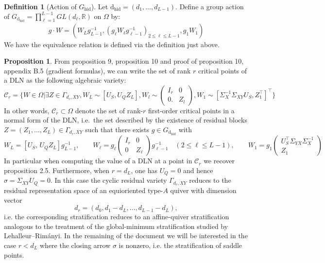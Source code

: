 \documentclass{article}
\newcommand{\hid}{\operatorname{hid}}
\newcommand{\dhid}{\operatorname{d_{hid}}}
\newcommand{\R}{\mathbb{R}}
\theoremstyle{definition}
\newtheorem{proposition}[theorem]{Proposition}
\newtheorem{definition}[theorem]{Definition}
\begin{document}
\begin{definition}[Action of $G_{\hid}$] Let $\dhid = (d_1, \dots, d_{L-1})$. Define a group action of $G_{\dhid} = \prod_{\ell=1}^{L-1} GL(d_\ell,\R)$ on $\Omega$ by:
\begin{align*}
    g\cdot W = (W_Lg_{L-1}^{-1}, (g_\ell W_\ell g_{\ell-1}^{-1})_{2\leq \ell \leq L-1}, g_1W_1)
\end{align*}
We have the equivalence relation is defined via the definition just above.
\end{definition}
\begin{proposition}
From \cite{achour2024loss} proposition 9, proposition 10 and proof of proposition 10, appendix B.5 (gradient formulas), we can write the set of rank $r$ critical points of a DLN as the following algebraic variety:
\begin{equation*}
    \mathcal{C}_r = \{W\in \Omega| \exists Z\in\Gamma_{d_r,XY}, W_L \sim [U_S, U_QZ_L],  W_l \sim \begin{pmatrix} I_r & 0 \\
                                                      0.  & Z_l      
                                        \end{pmatrix}, W_1 \sim [\Sigma_X^{-1}\Sigma_{XY}U_S, Z_1^{\top}]^{\top}\}
\end{equation*} 
In other words, $\mathcal{C}_r \subset \Omega$ denote the set of rank-$r$ first-order critical points in a normal form of the DLN, i.e.\ the set described by the existence of residual blocks $Z = (Z_1, \dots, Z_L)\in \Gamma_{d_r,XY}$ such that there exists $g \in G_{\dhid}$ with
\[
W_L = [U_S,\, U_Q Z_L]g_{L-1}^{-1}, \qquad
W_\ell = g_\ell\begin{pmatrix} I_r & 0 \\ 0 & Z_\ell \end{pmatrix}g_{\ell-1}^{-1} \quad (2\leq \ell \leq L-1), \qquad 
W_1 = g_1\begin{pmatrix} U_S^\top \Sigma_{YX}\Sigma_X^{-1} \\ Z_1 \end{pmatrix}
\]
In particular when computing the value of a DLN at a point in $\mathcal{C}_r$ we recover proposition 2.5. Furthermore, when $r=d_L$, one has $U_Q=0$ and hence $\sigma=\Sigma_{XY}U_Q=0$.
In this case the cyclic residual variety $\Gamma_{d_r,XY}$ reduces to the residual
representation space of an equioriented type-$A$ quiver with dimension vector
\[
d_r = (d_0,d_1-d_L,\dots,d_{L-1}-d_L),
\]
i.e. the corresponding stratification reduces to an affine-quiver stratification analogous to the treatment of the global-minimum
stratification studied by Lehalleur--Rim\'anyi. In the remaining of the document we will be interested in the case $r<d_L$ where the closing arrow $\sigma$ is nonzero, i.e. the stratification of saddle points.
\end{proposition}
\end{document}
